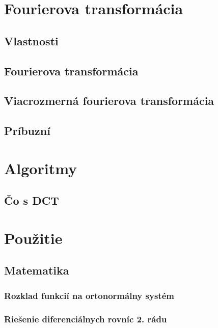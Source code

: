 



\chapter{Fourierova transformácia}
    
    
    
\section{Vlastnosti}
\section{Fourierova transformácia}
\section{Viacrozmerná fourierova transformácia}
\section{Príbuzní}

\chapter{Algoritmy}
    
    
    
    
    
    
    
    
    
    \section{Čo s DCT}


\chapter{Použitie}
\section{Matematika}
    \subsection{Rozklad funkcií na ortonormálny systém}
    
    \subsection{Riešenie diferenciálnych rovníc 2. rádu}    
